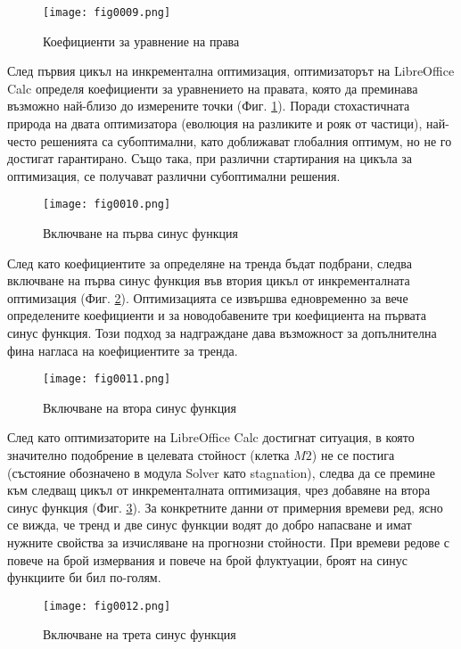 \begin{figure}[H]
  \centering
  \texttt{[image: fig0009.png]}
  \caption{Коефициенти за уравнение на права}
\label{fig0009}
\end{figure}

След първия цикъл на инкрементална оптимизация, оптимизаторът на LibreOffice Calc определя коефициенти за уравнението на правата, която да преминава възможно най-близо до измерените точки (Фиг. \ref{fig0009}). Поради стохастичната природа на двата оптимизатора (еволюция на разликите и рояк от частици), най-често решенията са субоптимални, като доближават глобалния оптимум, но не го достигат гарантирано. Също така, при различни стартирания на цикъла за оптимизация, се получават различни субоптимални решения. 

\begin{figure}[H]
  \centering
  \texttt{[image: fig0010.png]}
  \caption{Включване на първа синус функция}
\label{fig0010}
\end{figure}

След като коефициентите за определяне на тренда бъдат подбрани, следва включване на първа синус функция във втория цикъл от инкременталната оптимизация (Фиг. \ref{fig0010}). Оптимизацията се извършва едновременно за вече определените коефициенти и за новодобавените три коефициента на първата синус функция. Този подход за надграждане дава възможност за допълнителна фина нагласа на коефициентите за тренда. 

\begin{figure}[H]
  \centering
  \texttt{[image: fig0011.png]}
  \caption{Включване на втора синус функция}
\label{fig0011}
\end{figure}

След като оптимизаторите на LibreOffice Calc достигнат ситуация, в която значително подобрение в целевата стойност (клетка $M2$) не се постига (състояние обозначено в модула Solver като stagnation), следва да се премине към следващ цикъл от инкременталната оптимизация, чрез добавяне на втора синус функция (Фиг. \ref{fig0011}). За конкретните данни от примерния времеви ред, ясно се вижда, че тренд и две синус функции водят до добро напасване и имат нужните свойства за изчисляване на прогнозни стойности. При времеви редове с повече на брой измервания и повече на брой флуктуации, броят на синус функциите би бил по-голям. 

\begin{figure}[H]
  \centering
  \texttt{[image: fig0012.png]}
  \caption{Включване на трета синус функция}
\label{fig0012}
\end{figure}

